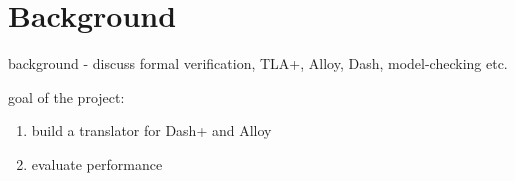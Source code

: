 \chapter{Background}


background - discuss formal verification, TLA+, Alloy, Dash, model-checking etc.

goal of the project:

\begin{enumerate}
	\item build a translator for Dash+ and Alloy
	\item evaluate performance
\end{enumerate}